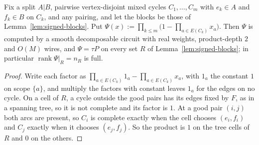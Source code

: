 \begin{proposition}\label{prop:dv}
Fix a split $A|B$, pairwise vertex-disjoint mixed cycles $C_1,\dots,C_m$ with $e_k\in A$ and $f_k\in B$ on $C_k$, and any pairing, and let the blocks be those of Lemma~\ref{lem:signed-blocks}. Put $\Psi(x):=\prod_{k\le m}\bigl(1-\prod_{a\in E(C_k)}x_a\bigr)$. Then $\Psi$ is computed by a smooth decomposable circuit with real weights, product-depth $2$ and $O(M)$ wires, and $\Psi=\tau P$ on every set $R$ of Lemma~\ref{lem:signed-blocks}; in particular $\operatorname{rank}\Psi|_R=n_R$ is full.
\end{proposition}

\begin{proof}
Write each factor as $\prod_{a\in E(C_k)}1_a-\prod_{a\in E(C_k)}x_a$, with $1_a$ the constant $1$ on scope $\{a\}$, and multiply the factors with constant leaves $1_a$ for the edges on no cycle. On a cell of $R$, a cycle outside the good pairs has its edges fixed by $F$, as in a spanning tree, so it is not complete and its factor is $1$. At a good pair $(i,j)$ both arcs are present, so $C_i$ is complete exactly when the cell chooses $(e_i,f_i)$ and $C_j$ exactly when it chooses $(e_j,f_j)$. So the product is $1$ on the tree cells of $R$ and $0$ on the others.
\end{proof}

